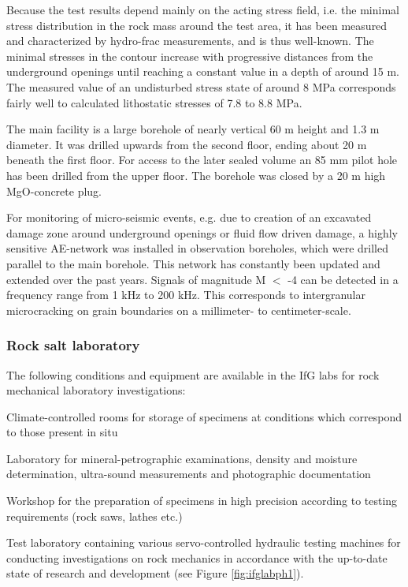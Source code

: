 Because the test results depend mainly on the acting stress field, i.e. the minimal stress distribution in the rock mass around the test area, it has been measured and  characterized by hydro-frac measurements, and is thus well-known. The minimal stresses in the contour increase with progressive distances from the underground openings until reaching a constant value in a depth of around 15 m. The measured value of an undisturbed stress state of around 8 MPa corresponds fairly well to calculated lithostatic stresses of 7.8 to 8.8 MPa. 

The main facility is a large borehole of nearly vertical 60 m height and 1.3 m diameter. It was drilled upwards from the second floor, ending about 20 m beneath the first floor. For access to the later sealed volume an 85 mm pilot hole has been drilled from the upper floor. The borehole was closed by a 20 m high MgO-concrete plug. 

For monitoring of micro-seismic events, e.g. due to creation of an excavated damage zone around underground openings or fluid flow driven damage, a highly sensitive AE-network was installed in observation boreholes, which were drilled parallel to the main borehole. This network has constantly been updated and extended over the past years. Signals of magnitude M $<$ -4 can be detected in a frequency range from 1 kHz to 200 kHz. This corresponds to intergranular microcracking on grain boundaries on a millimeter- to centimeter-scale. 

\subsubsection{Rock salt laboratory}

The following conditions and equipment are available in the IfG labs for rock mechanical laboratory investigations:

\begin{list}{-}{\leftmargin=1em \itemindent=0em \itemsep=0em}
\item Climate-controlled rooms for storage of specimens at conditions which correspond to those present in situ
\item Laboratory for mineral-petrographic examinations, density and moisture determination, ultra-sound measurements and 
photographic documentation
\item Workshop for the preparation of specimens in high precision according to testing requirements (rock saws, lathes etc.)
\item Test laboratory containing various servo-controlled hydraulic testing machines for conducting investigations on 
rock mechanics in accordance with the up-to-date state of research and development (see Figure \ref{fig:ifglabph1}).
\end{list} 

